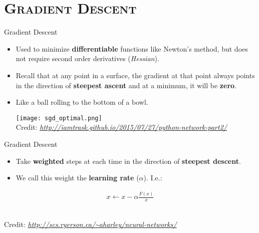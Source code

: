 \documentclass[xcolor=x11names,compress]{beamer}
\renewcommand{\(}{\begin{columns}}
\renewcommand{\)}{\end{columns}}
\newcommand{\<}[1]{\begin{column}{#1}}
\renewcommand{\>}{\end{column}}
\begin{document}
\section{\scshape Gradient Descent}
\begin{frame}{Gradient Descent}
	\begin{itemize}
		\item Used to minimize \textbf{differentiable} functions like Newton's method, but does not require second order derivatives (\textit{Hessian}).
		\item Recall that at any point in a surface, the gradient at that point always points in the direction of \textbf{steepest ascent} and at a minimum, it will be \textbf{zero}.
		\item Like a ball rolling to the bottom of a bowl.
		\begin{center}
			\texttt{[image: sgd\_optimal.png]}\\[-1ex]
			{\tiny Credit: {\itshape \url{http://iamtrask.github.io/2015/07/27/python-network-part2/}}}
		\end{center}
	\end{itemize}
\end{frame}


\begin{frame}{Gradient Descent}
	\begin{itemize}
		\item Take \textbf{weighted} steps at each time in the direction of \textbf{steepest descent}.
		\item We call this weight the \textbf{learning rate} ($\alpha$). I.e.:
	\end{itemize}
	\begin{gather*}
		x \leftarrow x - \alpha \frac{F(x)}{x}
	\end{gather*}
	\begin{center}
		\\
		{\tiny Credit: {\itshape \url{http://scs.ryerson.ca/~aharley/neural-networks/}}}
	\end{center}
\end{frame}

\end{document}
